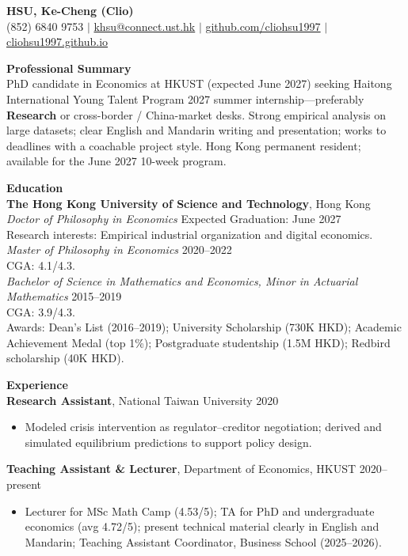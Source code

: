 \documentclass[11pt,letterpaper]{article}
\begin{document}
{\Large \textbf{HSU, Ke-Cheng (Clio)}}\\[1pt]
(852) 6840 9753 \quad $|$ \quad \href{mailto:khsu@connect.ust.hk}{khsu@connect.ust.hk} \quad $|$ \quad \href{https://github.com/cliohsu1997}{github.com/cliohsu1997} \quad $|$ \quad \href{https://cliohsu1997.github.io/}{cliohsu1997.github.io}

\vspace{0.15pt}

{\large \textbf{Professional Summary}}\\[-0.5pt]
PhD candidate in Economics at HKUST (expected June 2027) seeking Haitong International Young Talent Program 2027 summer internship---preferably \textbf{Research} or cross-border / China-market desks. Strong empirical analysis on large datasets; clear English and Mandarin writing and presentation; works to deadlines with a coachable project style. Hong Kong permanent resident; available for the June 2027 10-week program.

\vspace{0.15pt}

{\large \textbf{Education}}\\[-0.5pt]
\textbf{The Hong Kong University of Science and Technology}, Hong Kong\\
\textit{Doctor of Philosophy in Economics} \hfill Expected Graduation: June 2027\\
Research interests: Empirical industrial organization and digital economics.\\
\textit{Master of Philosophy in Economics} \hfill 2020--2022\\
CGA: 4.1/4.3.\\
\textit{Bachelor of Science in Mathematics and Economics, Minor in Actuarial Mathematics} \hfill 2015--2019\\
CGA: 3.9/4.3.\\
Awards: Dean's List (2016--2019); University Scholarship (730K HKD); Academic Achievement Medal (top 1\%); Postgraduate studentship (1.5M HKD); Redbird scholarship (40K HKD).

\vspace{0.15pt}

{\large \textbf{Experience}}\\[-0.5pt]
\textbf{Research Assistant}, National Taiwan University \hfill 2020\\
\vspace{-6pt}
\begin{itemize}
  \item Modeled crisis intervention as regulator--creditor negotiation; derived and simulated equilibrium predictions to support policy design.
\end{itemize}
\textbf{Teaching Assistant \& Lecturer}, Department of Economics, HKUST \hfill 2020--present\\
\vspace{-6pt}
\begin{itemize}
  \item Lecturer for MSc Math Camp (4.53/5); TA for PhD and undergraduate economics (avg 4.72/5); present technical material clearly in English and Mandarin; Teaching Assistant Coordinator, Business School (2025--2026).
\end{itemize}
\end{document}

